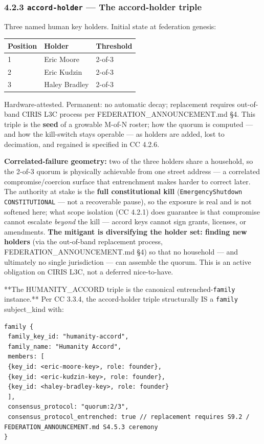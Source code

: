 \documentclass[11pt]{article}
\begin{document}
\subsubsection*{4.2.3 \texttt{accord-holder} — The accord-holder triple}


Three named human key holders. Initial state at federation genesis:


{\footnotesize
\begin{longtable}{|p{5.33cm}|p{5.33cm}|p{5.33cm}|}\hline
\textbf{Position} & \textbf{Holder} & \textbf{Threshold} \\ \hline\endhead
1 & Eric Moore & 2-of-3 \\ \hline
2 & Eric Kudzin & 2-of-3 \\ \hline
3 & Haley Bradley & 2-of-3 \\ \hline
\end{longtable}}


Hardware-attested. Permanent: no automatic decay; replacement requires out-of-band CIRIS L3C process per FEDERATION\_ANNOUNCEMENT.md §4. This triple is the \textbf{seed} of a growable M-of-N roster; how the quorum is computed — and how the kill-switch stays operable — as holders are added, lost to decimation, and regained is specified in CC 4.2.6.


\textbf{Correlated-failure geometry:} two of the three holders share a household, so the 2-of-3 quorum is physically achievable from one street address — a correlated compromise/coercion surface that entrenchment makes harder to correct later. The authority at stake is the \textbf{full constitutional kill} (\texttt{EmergencyShutdown CONSTITUTIONAL} — not a recoverable pause), so the exposure is real and is not softened here; what scope isolation (CC 4.2.1) does guarantee is that compromise cannot escalate \textit{beyond} the kill — accord keys cannot sign grants, licenses, or amendments. \textbf{The mitigant is diversifying the holder set: finding new holders} (via the out-of-band replacement process, FEDERATION\_ANNOUNCEMENT.md §4) so that no household — and ultimately no single jurisdiction — can assemble the quorum. This is an active obligation on CIRIS L3C, not a deferred nice-to-have.


**The HUMANITY\_ACCORD triple is the canonical entrenched-\texttt{family} instance.** Per CC 3.3.4, the accord-holder triple structurally IS a \texttt{family} subject\_kind with:


\begin{lstlisting}
family {
 family_key_id: "humanity-accord",
 family_name: "Humanity Accord",
 members: [
 {key_id: <eric-moore-key>, role: founder},
 {key_id: <eric-kudzin-key>, role: founder},
 {key_id: <haley-bradley-key>, role: founder}
 ],
 consensus_protocol: "quorum:2/3",
 consensus_protocol_entrenched: true // replacement requires S9.2 / FEDERATION_ANNOUNCEMENT.md S4.5.3 ceremony
}
\end{lstlisting}
\end{document}
